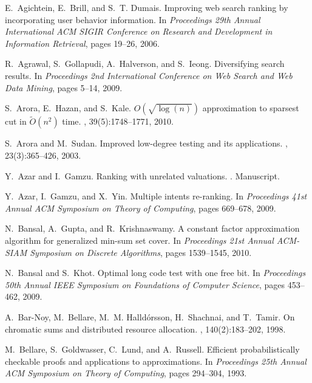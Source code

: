 \documentclass[11pt]{article}
\theoremstyle{plain}
\theoremstyle{definition}
\begin{document}
\begin{thebibliography}{10}

E.~Agichtein, E.~Brill, and S.~T. Dumais.
\newblock Improving web search ranking by incorporating user behavior
  information.
\newblock In {\em Proceedings 29th Annual International ACM SIGIR Conference on
  Research and Development in Information Retrieval}, pages 19--26, 2006.

R.~Agrawal, S.~Gollapudi, A.~Halverson, and S.~Ieong.
\newblock Diversifying search results.
\newblock In {\em Proceedings 2nd International Conference on Web Search and
  Web Data Mining}, pages 5--14, 2009.

S.~Arora, E.~Hazan, and S.~Kale.
\newblock ${O}(\sqrt{\log(n)})$ approximation to sparsest cut in
  ${{\tilde{O}}(n^2)}$ time.
, 39(5):1748--1771, 2010.

S.~Arora and M.~Sudan.
\newblock Improved low-degree testing and its applications.
, 23(3):365--426, 2003.

Y.~Azar and I.~Gamzu.
\newblock Ranking with unrelated valuations.
.
\newblock Manuscript.

Y.~Azar, I.~Gamzu, and X.~Yin.
\newblock Multiple intents re-ranking.
\newblock In {\em Proceedings 41st Annual ACM Symposium on Theory of
  Computing}, pages 669--678, 2009.

N.~Bansal, A.~Gupta, and R.~Krishnaswamy.
\newblock A constant factor approximation algorithm for generalized min-sum set
  cover.
\newblock In {\em Proceedings 21st Annual ACM-SIAM Symposium on Discrete
  Algorithms}, pages 1539--1545, 2010.

N.~Bansal and S.~Khot.
\newblock Optimal long code test with one free bit.
\newblock In {\em Proceedings 50th Annual IEEE Symposium on Foundations of
  Computer Science}, pages 453--462, 2009.

A.~Bar-Noy, M.~Bellare, M.~M. Halld{\'o}rsson, H.~Shachnai, and
T.~Tamir.
\newblock On chromatic sums and distributed resource allocation.
, 140(2):183--202, 1998.

M.~Bellare, S.~Goldwasser, C.~Lund, and A.~Russell.
\newblock Efficient probabilistically checkable proofs and applications to
  approximations.
\newblock In {\em Proceedings 25th Annual ACM Symposium on Theory of
  Computing}, pages 294--304, 1993.


\end{thebibliography}
\end{document}
